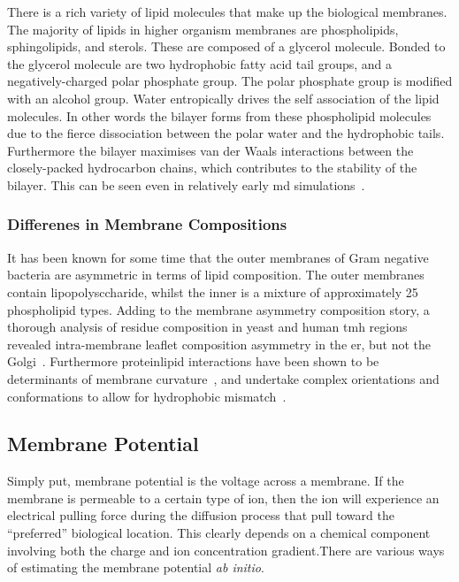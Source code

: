 There is a rich variety of lipid molecules that make up the biological membranes. The majority of lipids in higher organism membranes are phospholipids, sphingolipids, and sterols. These are composed of a glycerol molecule. Bonded to the glycerol molecule are two hydrophobic fatty acid tail groups, and a negatively-charged polar phosphate group. The polar phosphate group is modified with an alcohol group. Water entropically drives the self association of the lipid molecules. In other words the bilayer forms from these phospholipid molecules due to the fierce dissociation between the polar water and the hydrophobic tails. Furthermore the bilayer maximises van der Waals interactions between the closely-packed hydrocarbon chains, which contributes to the stability of the bilayer. This can be seen even in relatively early \gls{md} simulations~\cite{Goetz1998}.

\subsubsection{Differenes in Membrane Compositions}

It has been known for some time that the outer membranes of Gram negative bacteria are asymmetric in terms of lipid composition. The outer membranes contain lipopolysccharide, whilst the inner is a mixture of approximately 25 phospholipid types. Adding to the membrane asymmetry composition story, a thorough analysis of residue composition in yeast and human \gls{tmh} regions revealed intra-membrane leaflet composition asymmetry in the \gls{er}, but not the Golgi~\cite{Sharpe2010}. Furthermore protein\-lipid interactions have been shown to be determinants of membrane curvature~\cite{Jensen2004}, and undertake complex orientations and conformations to allow for hydrophobic mismatch~\cite{Planque2003}. %

\subsection{Membrane Potential}
Simply put, membrane potential is the voltage across a membrane. If the membrane is permeable to a certain type of ion, then the ion will experience an electrical pulling force during the diffusion process that pull toward the ``preferred'' biological location. This clearly depends on a chemical component involving both the charge and ion concentration gradient.There are various ways of estimating the membrane potential \textit{ ab initio}.

